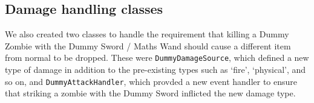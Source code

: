 \subsection{Damage handling classes}
We also created two classes to handle the requirement that killing a Dummy Zombie
with the Dummy Sword / Maths Wand should cause a different item from normal
to be dropped. These were \texttt{DummyDamageSource}, which defined a new type
of damage in addition to the pre-existing types such as `fire', `physical', and
so on, and \texttt{DummyAttackHandler}, which provded a new event handler to
ensure that striking a zombie with the Dummy Sword inflicted the new damage type.